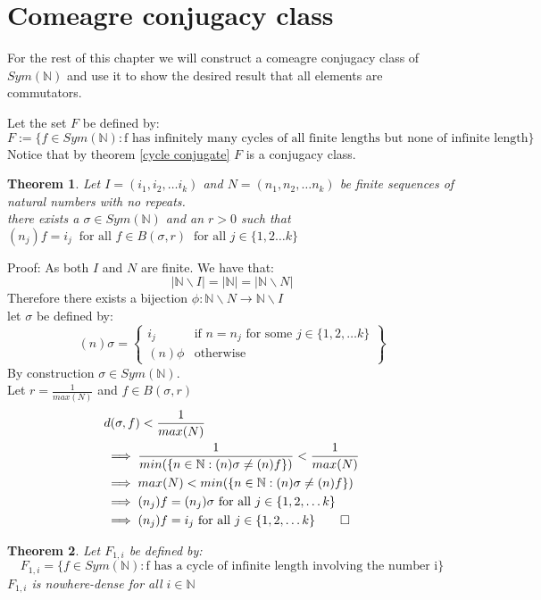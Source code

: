 \documentclass{report}
\newtheorem{theorem}{Theorem}[section]
\newenvironment{defn}[1][]{\refstepcounter{theorem}\begin{trivlist}
\item[\hskip \labelsep {\bfseries Definition  \thetheorem  \, \def\temp{#1}\ifx\temp\empty  #1\else  (#1)\fi
}]}   {\end{trivlist}}
\begin{document}
\section{Comeagre conjugacy class}
For the rest of this chapter we will construct a comeagre conjugacy class of $Sym(\mathbb{N})$ and use it to show the desired result that all elements are commutators.
\begin{defn}
Let the set $F$ be defined by:
$$F := \{f \in Sym(\mathbb{N}): \text{f has infinitely many cycles of all finite lengths but none of infinite length}\}$$
Notice that by theorem \ref{cycle conjugate} $F$ is a conjugacy class.
\end{defn}
\begin{theorem}
Let $I=(i_1,i_2,\ldots i_k)$ and $N=(n_1,n_2,\ldots n_k)$ be finite sequences of natural numbers  with no repeats.\\
there exists a $\sigma \in Sym(\mathbb{N})$ and an $r>0$ such that $(n_j)f=i_j\ \text{ for all } f \in B(\sigma,r)\ \text{ for all } j\in \{1,2\ldots k\}$
\end{theorem}\par
Proof: As both $I$ and $N$ are finite. We have that: $$\vert\mathbb{N}\backslash I\vert=\vert \mathbb{N} \vert = \vert\mathbb{N}\backslash N\vert$$
Therefore there exists a bijection $\phi :\mathbb{N} \backslash N \rightarrow \mathbb{N}\backslash I$\\
let $\sigma$ be defined by:
$$(n)\sigma=
 \left\{
    \begin{array}{lr}
      i_j& \text{if }n = n_j\text{ for some }j\in \{1,2,\ldots k\} \\
      (n)\phi&  \text{otherwise}
    \end{array}
    \right\}
$$
By construction $\sigma \in Sym(\mathbb{N})$.\\
Let $r = \frac{1}{max(N)}$ and $f\in B(\sigma, r)$
\begin{align*}
&d(\sigma, f) < \frac{1}{max(N)}\\
&\implies \frac{1}{min(\{n\in \mathbb{N}:(n)\sigma \neq  (n)f\})} < \frac{1}{max(N)}\\
&\implies max(N) < min(\{n\in \mathbb{N}:(n)\sigma \neq  (n)f\})\\
&\implies (n_j)f = (n_j)\sigma \text{ for all } j \in \{1,2,\ldots k\}\\
&\implies (n_j)f = i_j \text{ for all } j \in \{1,2,\ldots k\} \qed
\end{align*}
\begin{theorem}\label{nowhere-dense inf}
Let $F_{1,i}$ be defined by:
$$F_{1,i}=\{f \in Sym(\mathbb{N}): \text{f has a cycle of infinite length involving the number i}\}$$
$F_{1,i}$ is nowhere-dense for all $i \in \mathbb{N}$
\end{theorem}\par
\end{document}
